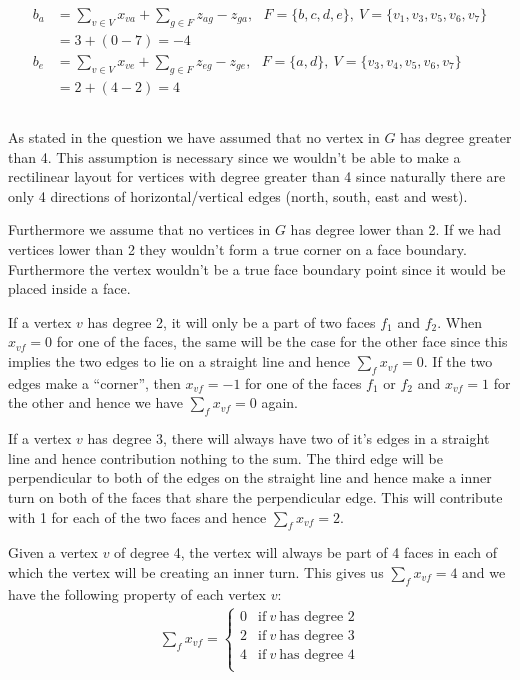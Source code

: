 \documentclass[11pt,a4paper,english]{article}
\begin{document}
\begin{align*}
    b_a &= \sum_{v \in V} x_{va} + \sum_{g \in F} z_{ag} - z_{ga},~~~ F = \{b,c,d,e\},~V = \{ v_1, v_3, v_5, v_6, v_7 \} \\
        &= 3 + (0 - 7) = -4 \\
    b_e &= \sum_{v \in V} x_{ve} + \sum_{g \in F} z_{eg} - z_{ge},~~~ F = \{a,d\},~V = \{ v_3, v_4, v_5, v_6, v_7 \} \\
        &= 2 + (4 - 2) = 4
\end{align*}

\subsection{}

As stated in the question we have assumed that no vertex in $G$ has degree
greater than 4. This assumption is necessary since we wouldn't be able to make
a rectilinear layout for vertices with degree greater than 4 since naturally
there are only 4 directions of horizontal/vertical edges (north, south, east
and west).

Furthermore we assume that no vertices in $G$ has degree lower than 2. If we
had vertices lower than 2 they wouldn't form a true corner on a face boundary.
Furthermore the vertex wouldn't be a true face boundary point since it would
be placed inside a face.

If a vertex $v$ has degree 2, it will only be a part of two faces $f_1$ and
$f_2$. When $x_{vf} = 0$ for one of the faces, the same will be the case for
the other face since this implies the two edges to lie on a straight line and
hence $\sum_f x_{vf} = 0$. If the two edges make a ``corner'', then $x_{vf}
= -1$ for one of the faces $f_1$ or $f_2$ and $x_{vf} = 1$ for the other and
hence we have $\sum_f x_{vf} = 0$ again.

If a vertex $v$ has degree 3, there will always have two of it's edges in a
straight line and hence contribution nothing to the sum. The third edge will
be perpendicular to both of the edges on the straight line and hence make a
inner turn on both of the faces that share the perpendicular edge. This will
contribute with 1 for each of the two faces and hence $\sum_f x_{vf} = 2$.

Given a vertex $v$ of degree 4, the vertex will always be part of 4 faces in
each of which the vertex will be creating an inner turn. This gives us $\sum_f
x_{vf} = 4$ and we have the following property of each vertex $v$:
\begin{align}
	\sum_f x_{vf} = \begin{cases}
				0 & \text{if}~v~\text{has degree 2} \\
				2 & \text{if}~v~\text{has degree 3} \\
				4 & \text{if}~v~\text{has degree 4} \\
			      \end{cases}
\end{align}




\end{document}
